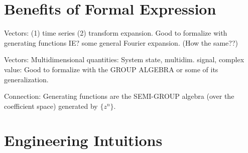 \documentclass{article}
\begin{document}
\section{Benefits of Formal Expression}

Vectors: (1) time series (2) transform expansion.  Good to formalize with
generating functions IE? some general Fourier expansion.  (How the same??)

Vectors: Multidimensional quantities: System state, multidim. signal, complex
value:  Good to formalize with the GROUP ALGEBRA or some of its generalization.

Connection:  Generating functions are the 
SEMI-GROUP algebra (over the coefficient space)
generated by $\{ z^n \}$.


\section{Engineering Intuitions}
\end{document}

